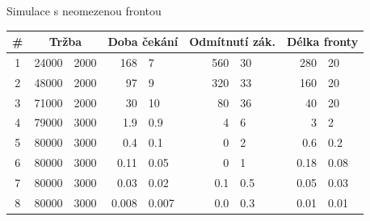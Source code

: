 \begin{frame}{Simulace s neomezenou frontou}
\small
	\begin{tabular}{c|r@{$\pm$}l|r@{$\pm$}l|r@{$\pm$}l|r@{$\pm$}l}
	\#  & \multicolumn{2}{|c|}{Tržba} & \multicolumn{2}{|c|}{Doba čekání} & \multicolumn{2}{|c|}{Odmítnutí zák.} & \multicolumn{2}{|c}{Délka fronty}\\ \hline\hline	
	1 &   24000 & 2000  &  168     &  7      &  560   & 30    &  280    & 20    \\
	2 &   48000 & 2000  &   97     &  9      &  320   & 33    &  160    & 20    \\
	3 &   71000 & 2000  &   30     & 10      &   80   & 36    &   40    & 20    \\
	4 &   79000 & 3000  &    1.9   &  0.9    &    4   &  6    &    3    &  2    \\
	5 &   80000 & 3000  &    0.4   &  0.1    &    0   &  2    &    0.6  &  0.2  \\
	6 &   80000 & 3000  &    0.11  &  0.05   &    0   &  1    &    0.18 &  0.08 \\
	7 &   80000 & 3000  &    0.03  &  0.02   &    0.1 &  0.5  &    0.05 &  0.03 \\
	8 &   80000 & 3000  &    0.008 &  0.007  &    0.0 &  0.3  &    0.01 &  0.01 
\end{tabular}
\end{frame}


